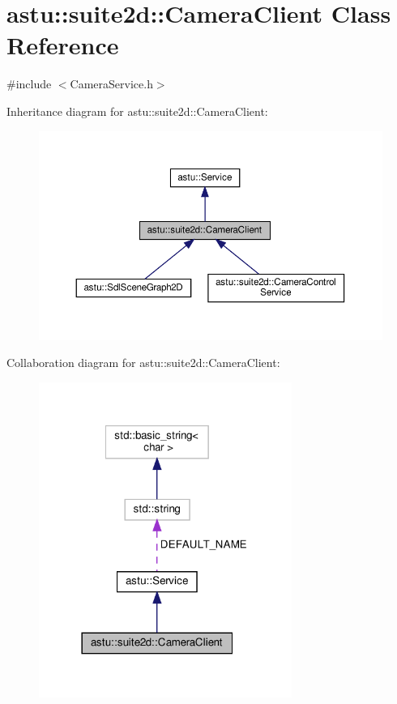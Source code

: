 \hypertarget{classastu_1_1suite2d_1_1CameraClient}{}\section{astu\+:\+:suite2d\+:\+:Camera\+Client Class Reference}
\label{classastu_1_1suite2d_1_1CameraClient}


{\ttfamily \#include $<$Camera\+Service.\+h$>$}



Inheritance diagram for astu\+:\+:suite2d\+:\+:Camera\+Client\+:\nopagebreak
\begin{figure}[H]
\begin{center}
\leavevmode
\includegraphics[width=350pt]{classastu_1_1suite2d_1_1CameraClient__inherit__graph}
\end{center}
\end{figure}


Collaboration diagram for astu\+:\+:suite2d\+:\+:Camera\+Client\+:\nopagebreak
\begin{figure}[H]
\begin{center}
\leavevmode
\includegraphics[width=234pt]{classastu_1_1suite2d_1_1CameraClient__coll__graph}
\end{center}
\end{figure}
